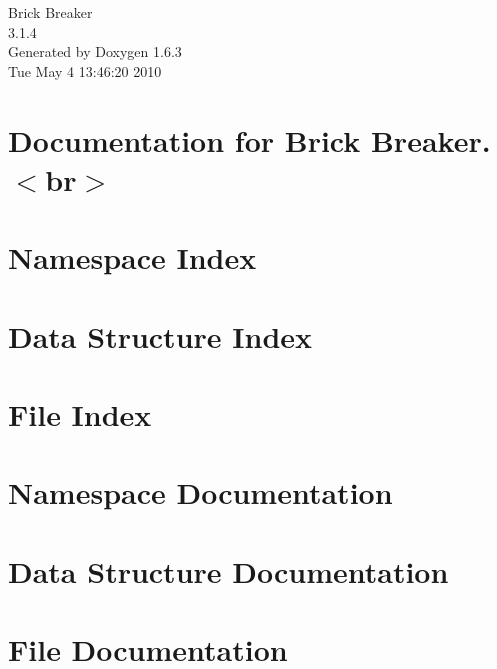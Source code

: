 \documentclass[a4paper]{book}
\begin{document}
\hypersetup{pageanchor=false}
\begin{titlepage}
\vspace*{7cm}
\begin{center}
{\Large Brick Breaker \\[1ex]\large 3.1.4 }\\
\vspace*{1cm}
{\large Generated by Doxygen 1.6.3}\\
\vspace*{0.5cm}
{\small Tue May 4 13:46:20 2010}\\
\end{center}
\end{titlepage}
\clearemptydoublepage
{}
\tableofcontents
\clearemptydoublepage
{}
\hypersetup{pageanchor=true}
\chapter{Documentation for Brick Breaker. $<$br$>$}
\label{index}\hypertarget{index}{}
\chapter{Namespace Index}

\chapter{Data Structure Index}

\chapter{File Index}

\chapter{Namespace Documentation}

\chapter{Data Structure Documentation}










\chapter{File Documentation}






\printindex
\end{document}
